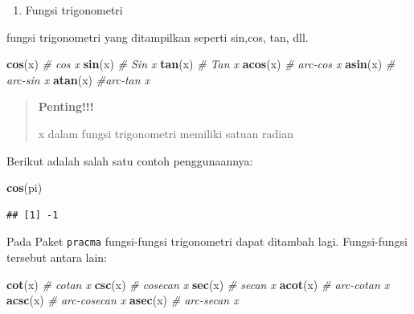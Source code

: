 \documentclass[
]{book}
\newenvironment{Shaded}{\begin{snugshade}}{\end{snugshade}}
\newcommand{\CommentTok}[1]{\textcolor[rgb]{0.56,0.35,0.01}{\textit{#1}}}
\newcommand{\FunctionTok}[1]{\textcolor[rgb]{0.13,0.29,0.53}{\textbf{#1}}}
\newcommand{\NormalTok}[1]{#1}
\providecommand{\tightlist}{%
  \setlength{\itemsep}{0pt}\setlength{\parskip}{0pt}}
\theoremstyle{definition}
\theoremstyle{definition}
\theoremstyle{definition}
\theoremstyle{definition}
\theoremstyle{remark}
\begin{document}
\begin{enumerate}
\def\labelenumi{\arabic{enumi}.}
\setcounter{enumi}{1}
\tightlist
\item
  Fungsi trigonometri
\end{enumerate}

fungsi trigonometri yang ditampilkan seperti sin,cos, tan, dll.

\begin{Shaded}
\begin{Highlighting}[]
\FunctionTok{cos}\NormalTok{(x) }\CommentTok{\# cos x}
\FunctionTok{sin}\NormalTok{(x) }\CommentTok{\# Sin x}
\FunctionTok{tan}\NormalTok{(x) }\CommentTok{\# Tan x}
\FunctionTok{acos}\NormalTok{(x) }\CommentTok{\# arc{-}cos x}
\FunctionTok{asin}\NormalTok{(x) }\CommentTok{\# arc{-}sin x}
\FunctionTok{atan}\NormalTok{(x) }\CommentTok{\#arc{-}tan x}
\end{Highlighting}
\end{Shaded}

\begin{quote}
\textbf{Penting!!!}

x dalam fungsi trigonometri memiliki satuan radian
\end{quote}

Berikut adalah salah satu contoh penggunaannya:

\begin{Shaded}
\begin{Highlighting}[]
\FunctionTok{cos}\NormalTok{(pi)}
\end{Highlighting}
\end{Shaded}

\begin{verbatim}
## [1] -1
\end{verbatim}

Pada Paket \texttt{pracma} fungsi-fungsi trigonometri dapat ditambah lagi. Fungsi-fungsi tersebut antara lain:

\begin{Shaded}
\begin{Highlighting}[]
\FunctionTok{cot}\NormalTok{(x) }\CommentTok{\# cotan x}
\FunctionTok{csc}\NormalTok{(x) }\CommentTok{\# cosecan x}
\FunctionTok{sec}\NormalTok{(x) }\CommentTok{\# secan x}
\FunctionTok{acot}\NormalTok{(x) }\CommentTok{\# arc{-}cotan x}
\FunctionTok{acsc}\NormalTok{(x) }\CommentTok{\# arc{-}cosecan x}
\FunctionTok{asec}\NormalTok{(x) }\CommentTok{\# arc{-}secan x}
\end{Highlighting}
\end{Shaded}
\end{document}
